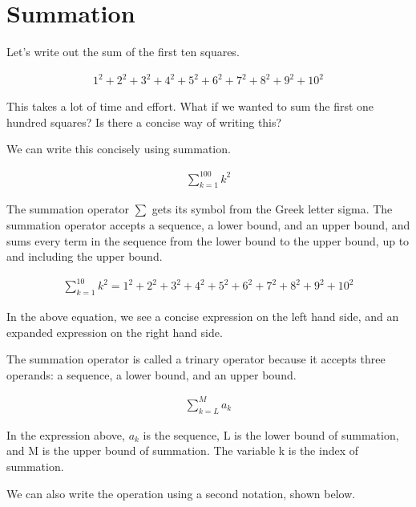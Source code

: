 \documentclass{article}
\begin{document}
\section{Summation}
\begin{flushleft}
Let's write out the sum of the first ten squares.
\end{flushleft}
\begin{align*}
1^2 + 2^2 + 3^2 + 4^2 + 5^2 + 6^2 + 7^2 + 8^2 + 9^2 + 10^2
\end{align*}
\begin{flushleft}
This takes a lot of time and effort. What if we wanted to sum the first one hundred squares? Is there a concise way of writing this?
\end{flushleft}
\begin{flushleft}
We can write this concisely using summation.
\end{flushleft}
\begin{align*}
\sum_{k=1}^{100} k^2
\end{align*}
\begin{flushleft}
The summation operator $\sum$ gets its symbol from the Greek letter sigma. The summation operator accepts a sequence, a lower bound, and an upper bound, and sums every term in the sequence from the lower bound to the upper bound, up to and including the upper bound.
\end{flushleft}
\begin{align*}
\sum_{k=1}^{10} k^2 = 1^2 + 2^2 + 3^2 + 4^2 + 5^2 + 6^2 + 7^2 + 8^2 + 9^2 + 10^2
\end{align*}
\begin{flushleft}
In the above equation, we see a concise expression on the left hand side, and an expanded expression on the right hand side.
\end{flushleft}
\begin{flushleft}
The summation operator is called a trinary operator because it accepts three operands: a sequence, a lower bound, and an upper bound.
\end{flushleft}
\begin{align*}
\sum_{k=L}^{M} a_{k}
\end{align*}
\begin{flushleft}
In the expression above, $a_{k}$ is the sequence, L is the lower bound of summation, and M is the upper bound of summation. The variable k is the index of summation.
\end{flushleft}
\begin{flushleft}
We can also write the operation using a second notation, shown below.
\end{flushleft}
\end{document}
